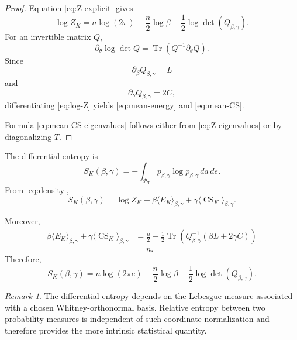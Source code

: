 \documentclass[11pt]{article}
\theoremstyle{definition}
\theoremstyle{remark}
\newtheorem{remark}[theorem]{Remark}
\newcommand{\Tr}{\operatorname{Tr}}
\newcommand{\CS}{\operatorname{CS}}
\begin{document}
\begin{proof}
Equation \eqref{eq:Z-explicit} gives
\begin{equation}
\log Z_K
=
n\log(2\pi)
-
\frac{n}{2}\log\beta
-
\frac12\log\det(Q_{\beta,\gamma}).
\label{eq:log-Z}
\end{equation}
For an invertible matrix \(Q\),
\begin{equation}
\partial_\theta\log\det Q
=
\Tr\left(
Q^{-1}\partial_\theta Q
\right).
\end{equation}
Since
\begin{equation}
\partial_\beta Q_{\beta,\gamma}=L
\end{equation}
and
\begin{equation}
\partial_\gamma Q_{\beta,\gamma}=2C,
\end{equation}
differentiating \eqref{eq:log-Z} yields
\eqref{eq:mean-energy} and \eqref{eq:mean-CS}.

Formula \eqref{eq:mean-CS-eigenvalues} follows either from
\eqref{eq:Z-eigenvalues} or by diagonalizing \(T\).
\end{proof}

The differential entropy is
\begin{equation}
S_K(\beta,\gamma)
=
-\int_{\mathcal P_{\mathrm T}}
p_{\beta,\gamma}
\log p_{\beta,\gamma}
\,da\,de.
\label{eq:entropy-definition}
\end{equation}
From \eqref{eq:density},
\begin{equation}
S_K(\beta,\gamma)
=
\log Z_K
+
\beta\langle E_K\rangle_{\beta,\gamma}
+
\gamma\langle\CS_K\rangle_{\beta,\gamma}.
\label{eq:entropy-identity}
\end{equation}

Moreover,
\begin{align}
\beta\langle E_K\rangle_{\beta,\gamma}
+
\gamma\langle\CS_K\rangle_{\beta,\gamma}
&=
\frac{n}{2}
+
\frac12
\Tr\left(
Q_{\beta,\gamma}^{-1}
(\beta L+2\gamma C)
\right)
\nonumber\\
&=
n.
\end{align}
Therefore,
\begin{equation}
S_K(\beta,\gamma)
=
n\log(2\pi e)
-
\frac{n}{2}\log\beta
-
\frac12\log\det(Q_{\beta,\gamma}).
\label{eq:entropy-explicit}
\end{equation}

\begin{remark}
The differential entropy depends on the Lebesgue measure
associated with a chosen Whitney-orthonormal basis. Relative
entropy between two probability measures is independent of
such coordinate normalization and therefore provides the more
intrinsic statistical quantity.
\end{remark}
\end{document}
